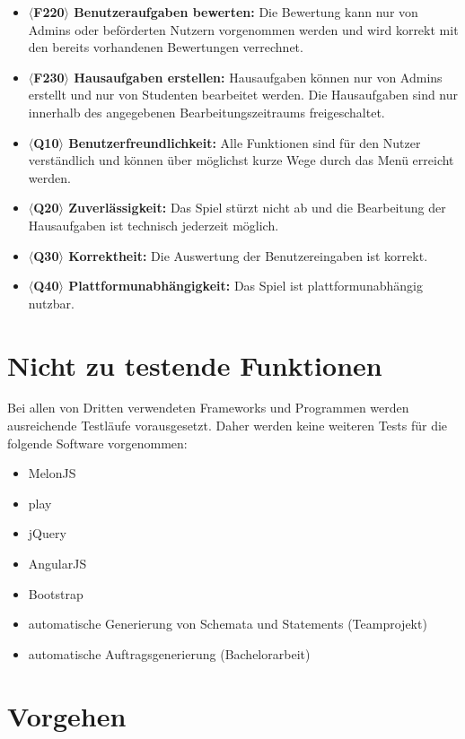 \begin{itemize}
\item \textbf{$\langle$F220$\rangle$ Benutzeraufgaben bewerten: }Die Bewertung kann nur von Admins oder beförderten Nutzern vorgenommen werden und wird korrekt mit den bereits vorhandenen Bewertungen verrechnet.
\item \textbf{$\langle$F230$\rangle$ Hausaufgaben erstellen: }Hausaufgaben können nur von Admins erstellt und nur von Studenten bearbeitet werden. Die Hausaufgaben sind nur innerhalb des angegebenen Bearbeitungszeitraums freigeschaltet.
\item \textbf{$\langle$Q10$\rangle$ Benutzerfreundlichkeit: }Alle Funktionen sind für den Nutzer verständlich und können über möglichst kurze Wege durch das Menü erreicht werden.
\item \textbf{$\langle$Q20$\rangle$ Zuverlässigkeit: }Das Spiel stürzt nicht ab und die Bearbeitung der Hausaufgaben ist technisch jederzeit möglich.
\item \textbf{$\langle$Q30$\rangle$ Korrektheit: }Die Auswertung der Benutzereingaben ist korrekt.
\item \textbf{$\langle$Q40$\rangle$ Plattformunabhängigkeit: }Das Spiel ist plattformunabhängig nutzbar.
\end{itemize}
 

\section{Nicht zu testende Funktionen}

Bei allen von Dritten verwendeten Frameworks und Programmen werden ausreichende Testläufe vorausgesetzt. Daher werden keine weiteren Tests für die folgende Software vorgenommen:
\begin{itemize}
\item MelonJS
\item play
\item jQuery
\item AngularJS
\item Bootstrap
\item automatische Generierung von Schemata und Statements (Teamprojekt)
\item automatische Auftragsgenerierung (Bachelorarbeit)
\end{itemize}

\section{Vorgehen}

